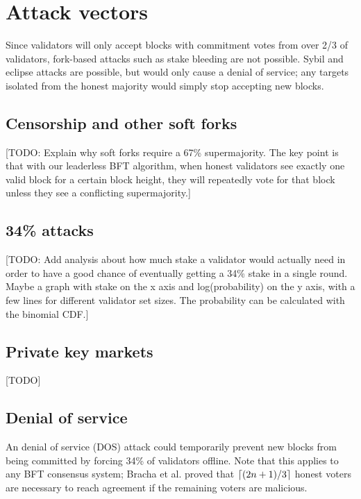 \section{Attack vectors}
\label{attacks}

Since validators will only accept blocks with commitment votes from over 2/3 of validators, fork-based attacks such as stake bleeding \cite{gazi2018stake} are not possible. Sybil and eclipse attacks are possible, but would only cause a denial of service; any targets isolated from the honest majority would simply stop accepting new blocks.


\subsection{Censorship and other soft forks}
\label{soft-forks}

[TODO: Explain why soft forks require a 67\% supermajority. The key point is that with our leaderless BFT algorithm, when honest validators see exactly one valid block for a certain block height, they will repeatedly vote for that block unless they see a conflicting supermajority.]


\subsection{34\% attacks}

[TODO: Add analysis about how much stake a validator would actually need in order to have a good chance of eventually getting a 34\% stake in a single round. Maybe a graph with stake on the x axis and log(probability) on the y axis, with a few lines for different validator set sizes. The probability can be calculated with the binomial CDF.]


\subsection{Private key markets}

[TODO]


\subsection{Denial of service}

An denial of service (DOS) attack could temporarily prevent new blocks from being committed by forcing 34\% of validators offline. Note that this applies to any BFT consensus system; Bracha et al. \cite{bracha1985asynchronous} proved that $\lceil(2n+1)/3\rceil$ honest voters are necessary to reach agreement if the remaining voters are malicious.

